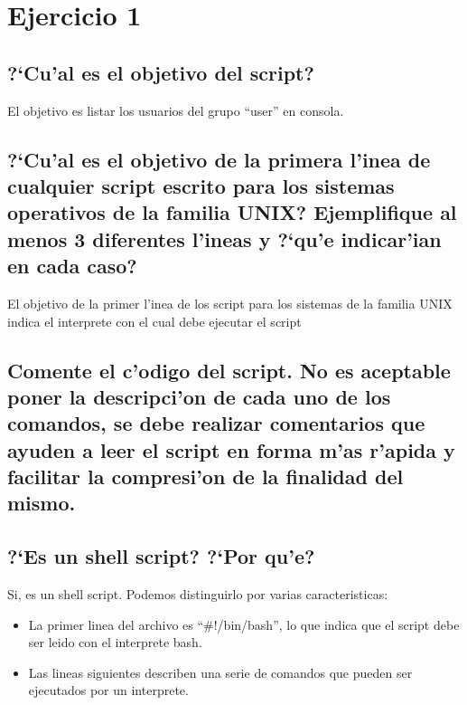 \documentclass[a4paper,11pt]{article}
\newcommand{\?}{?`}
\begin{document}

\setcounter{page}{1}
\tableofcontents
\newpage
\setcounter{page}{1}

\section{Ejercicio 1}
\subsection[Punto A]{\?Cu'al es el objetivo del script?}
El objetivo es listar los usuarios del grupo ``user'' en consola.

\subsection[Punto B]{\?Cu'al es el objetivo de la primera l'inea de cualquier script escrito para los sistemas
operativos de la familia UNIX? Ejemplifique al menos 3 diferentes l'ineas y \?qu'e indicar'ian
en cada caso?}

El objetivo de la primer l'inea de los script para los sistemas de la familia UNIX indica el interprete con el cual debe ejecutar el script

\subsection[Punto C]{Comente el c'odigo del script. No es aceptable poner la descripci'on de cada uno de
los comandos, se debe realizar comentarios que ayuden a leer el script en forma m'as
r'apida y facilitar la compresi'on de la finalidad del mismo.}



\subsection[Punto D]{\?Es un shell script? \?Por qu'e?}

Si, es un shell script. Podemos distinguirlo por varias caracteristicas:

\begin{itemize}
 \item La primer linea del archivo es ``\#!/bin/bash'', lo que indica que el script debe ser leido con el interprete bash.
 \item Las lineas siguientes describen una serie de comandos que pueden ser ejecutados por un interprete.
\end{itemize}
\end{document}
